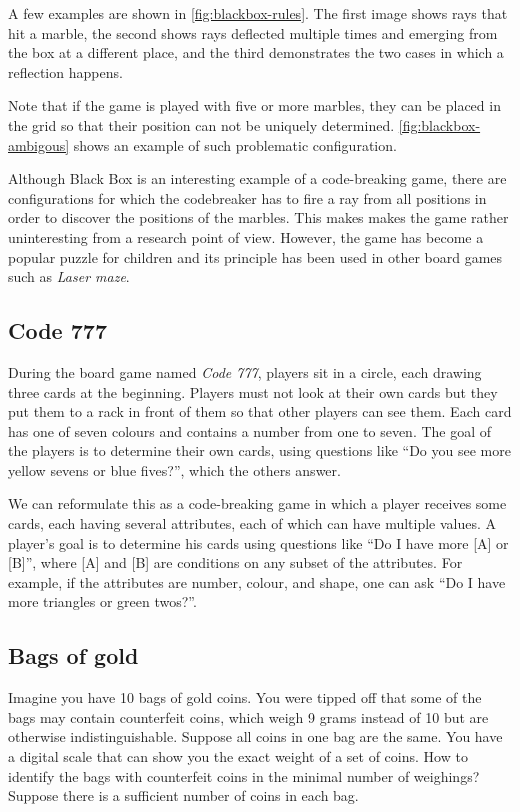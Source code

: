 A few examples are shown in \autoref{fig:blackbox-rules}.
The first image shows rays that hit a marble,
  the second shows rays deflected multiple times and emerging from
  the box at a different place, and the third demonstrates
  the two cases in which a reflection happens.

Note that if the game is played with five or more marbles,
  they can be placed in the grid so that their position can
  not be uniquely determined.
\autoref{fig:blackbox-ambigous} shows an example of such
  problematic configuration.

Although Black Box is an interesting example of a code-breaking game,
  there are configurations for which the codebreaker has to fire a ray from
  all positions in order to discover the positions of the marbles.
This makes makes the game rather uninteresting from a research point of view.
However, the game has become a popular puzzle for children and
  its principle has been used in other board games such as \emph{Laser maze}\cite{lasermaze}.

\subsection{Code 777}

During the board game named \emph{Code 777}, players sit in a circle,
  each drawing three cards at the beginning.
Players must not look at their own cards but they put them to a rack in front of them
  so that other players can see them.
Each card has one of seven colours and contains a number from one to seven.
The goal of the players is to determine their own cards, using questions like
 ``Do you see more yellow sevens or blue fives?'', which the others answer\cite{code777}.

We can reformulate this as a code-breaking game in which a player
  receives some cards, each having several attributes, each of which can have
  multiple values.
A player's goal is to determine his cards using questions
  like ``Do I have more [A] or [B]'', where [A] and [B] are conditions on
  any subset of the attributes.
For example, if the attributes are number, colour, and shape, one can ask
  ``Do I have more triangles or green twos?''.

\subsection{Bags of gold}

Imagine you have 10 bags of gold coins.
You were tipped off that some of the bags may contain counterfeit coins,
  which weigh 9 grams instead of 10 but are otherwise indistinguishable.
Suppose all coins in one bag are the same.
You have a digital scale that can show you the exact weight of a set of coins.
How to identify the bags with counterfeit coins in
  the minimal number of weighings?
Suppose there is a sufficient number of coins in each bag.


